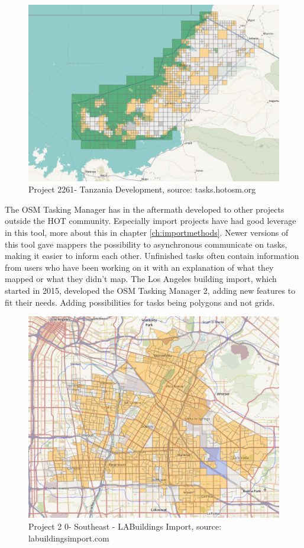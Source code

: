 \begin{figure}[H]
    \centering
    \includegraphics[scale=0.3]{figures/FixedByMe/taskingmanager.png}
    \caption{Project 2261- Tanzania Development, source: tasks.hotosm.org}
    \label{fig:project2261}
\end{figure} 

The OSM Tasking Manager has in the aftermath developed to other projects outside the HOT community. Especially import projects have had good leverage in this tool, more about this in chapter \ref{ch:importmethods}. Newer versions of this tool gave mappers the possibility to asynchronous communicate on tasks, making it easier to inform each other. Unfinished tasks often contain information from users who have been working on it with an explanation of what they mapped or what they didn't map. The Los Angeles building import, which started in 2015, developed the OSM Tasking Manager 2, adding new features to fit their needs. Adding possibilities for tasks being polygons and not grids. 

\begin{figure}[H]
    \centering
    \includegraphics[scale=0.3]{figures/FixedByMe/taskingman2.png}
    \caption{Project 2 0- Southeast - LABuildings Import, source: labuildingsimport.com}
    \label{fig:project20}
\end{figure} 

